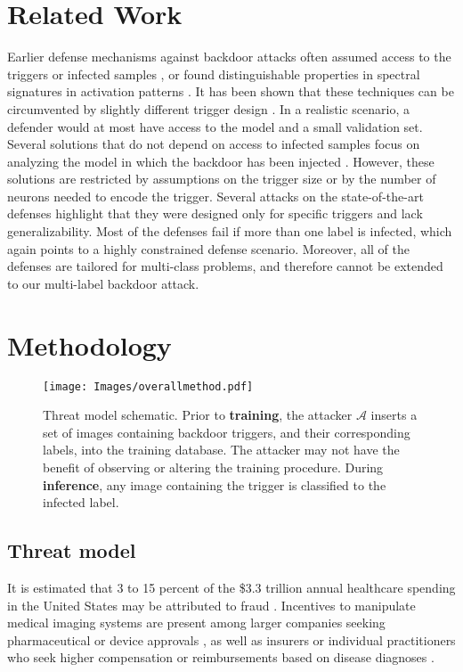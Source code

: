\documentclass[letterpaper]{article} %
\begin{document}
\section{Related Work} 
Earlier defense mechanisms against backdoor attacks often assumed access to the triggers or infected samples \cite{tran2018spectral}, or found distinguishable properties in spectral signatures in activation patterns \cite{chen2018detecting}. It has been shown that these techniques can be circumvented by slightly different trigger design \cite{tan2019bypassing, bagdasaryan2020blind, liao2018backdoor}. In a realistic scenario, a defender would at most have access to the model and a small validation set.  Several solutions that do not depend on access to infected samples focus on analyzing the model in which the backdoor has been injected \cite{CCS_ABS, wang2019neural, CCS_ABS, nips_generative18, liu2018fine}. However, these solutions are restricted by assumptions on the trigger size or by the number of neurons needed to encode the trigger. Several attacks on the state-of-the-art defenses highlight that they were designed only for specific triggers and lack generalizability. Most of the defenses fail if more than one label is infected, which again points to a highly constrained defense scenario. Moreover, all of the defenses are tailored for multi-class problems, and therefore cannot be extended to our multi-label backdoor attack.

\section{Methodology}

\begin{figure}[ht]
\begin{center}
\texttt{[image: Images/overallmethod.pdf]}
\end{center}
   \caption{Threat model schematic. Prior to \textbf{training}, the attacker $\mathcal{A}$ inserts a set of images containing backdoor triggers, and their corresponding labels, into the training database. The attacker may not have the benefit of observing or altering the training procedure. During \textbf{inference}, any image containing the trigger is classified to the infected label.
   }
\label{overallmethod}
\end{figure}

\subsection{Threat model}
It is estimated that 3 to 15 percent of the \$3.3 trillion annual healthcare spending in the United States may be attributed to fraud \cite{rudman2009healthcare}. Incentives to manipulate medical imaging systems are present among larger companies seeking pharmaceutical or device approvals \cite{kalb1999health, pien2005using}, as well as insurers or individual practitioners who seek higher compensation or reimbursements based on disease diagnoses \cite{ornstein2014top,reynolds2005metabolic,kesselheim2005overbilling,wynia2000physician}.
 
\end{document}

